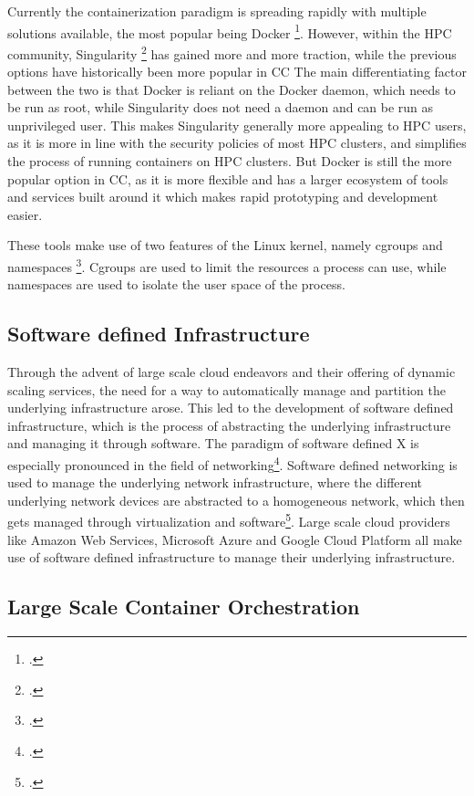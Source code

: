 Currently the containerization paradigm is spreading rapidly with multiple solutions available, the most popular being Docker \footcite{StackOverflowDeveloper}.
However, within the \ac{HPC} community, Singularity \footcite{IntroductionSoftwareContainers} has gained more and more traction, while the previous options have historically been more popular in \ac{CC}
The main differentiating factor between the two is that Docker is reliant on the Docker daemon, which needs to be run as root, while Singularity does not need a daemon and can be run as unprivileged user.
This makes Singularity generally more appealing to \ac{HPC} users, as it is more in line with the security policies of most \ac{HPC} clusters, and simplifies the process of running containers on \ac{HPC} clusters.
But Docker is still the more popular option in \ac{CC}, as it is more flexible and has a larger ecosystem of tools and services built around it which makes rapid prototyping and development easier.

These tools make use of two features of the Linux kernel, namely cgroups and namespaces \footcite{WhatContainerDocker}.
Cgroups are used to limit the resources a process can use, while namespaces are used to isolate the user space of the process.

\subsection*{Software defined Infrastructure}

Through the advent of large scale cloud endeavors and their offering of dynamic scaling services, the need for a way to automatically manage and partition the underlying infrastructure arose.
This led to the development of software defined infrastructure, which is the process of abstracting the underlying infrastructure and managing it through software.
The paradigm of software defined X is especially pronounced in the field of networking\footcite{xiaSurveySoftwareDefinedNetworking2015}.
Software defined networking is used to manage the underlying network infrastructure,
where the different underlying network devices are abstracted to a homogeneous network, which then gets managed through virtualization and software\footcite{baurCloudOrchestrationFeatures2015}.
Large scale cloud providers like Amazon Web Services, Microsoft Azure and Google Cloud Platform all make use of software defined infrastructure to manage their underlying infrastructure.

\subsection*{Large Scale Container Orchestration}

